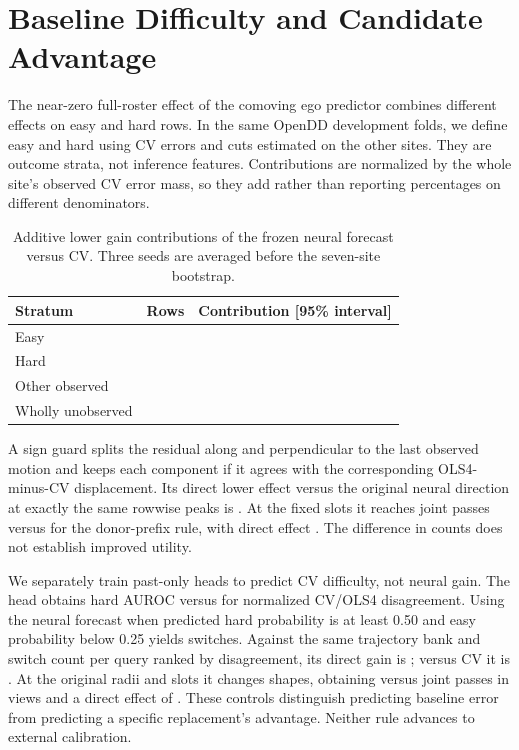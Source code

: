 \section{Baseline Difficulty and Candidate Advantage}

The near-zero full-roster effect of the comoving ego predictor
combines different effects on easy and hard rows. In the same
OpenDD development folds, we define easy and hard using CV errors
and cuts estimated on the other sites. They are outcome strata,
not inference features. Contributions are normalized by the
whole site's observed CV error mass, so they add rather than
reporting percentages on different denominators.

\begin{table}[h]
\centering
\caption{Additive lower gain contributions of the frozen neural
forecast versus CV. Three seeds are averaged before the
seven-site bootstrap.}
\small
\begin{tabular}{lrl}
\toprule
Stratum & Rows & Contribution [95\% interval] \\
\midrule
Easy & \DifficultyEasyRows{} & \DifficultyEasyEffect{} \\
Hard & \DifficultyHardRows{} & \DifficultyHardEffect{} \\
Other observed & \DifficultyOtherRows{} & \DifficultyOtherEffect{} \\
Wholly unobserved & \DifficultyUnobservedRows{} & \DifficultyUnobservedEffect{} \\
\bottomrule
\end{tabular}
\end{table}

A sign guard splits the residual along and perpendicular to
the last observed motion and keeps each component if it agrees
with the corresponding OLS4-minus-CV displacement. Its direct
lower effect versus the original neural direction at exactly
the same rowwise peaks is \DifficultyDirection{}.
At the \DifficultyEdits{} fixed slots it reaches
\DifficultyGuard{} joint passes versus \DifficultyPrefix{} for
the donor-prefix rule, with direct effect \DifficultyGuardMatched{}.
The difference in counts does not establish improved utility.

We separately train \DifficultyFits{} past-only heads to predict CV
difficulty, not neural gain. The head obtains hard AUROC
\DifficultyAUROC{} versus \DifficultyMotionAUC{} for normalized
CV/OLS4 disagreement. Using the neural forecast when predicted hard
probability is at least 0.50 and easy probability below 0.25 yields
\DifficultyRawEdits{} switches. Against the same trajectory bank
and switch count per query ranked by disagreement, its direct
gain is \DifficultyGatedMotion{}; versus CV it is
\DifficultyGatedCV{}. At the original radii and slots it changes
\DifficultySwaps{} shapes, obtaining \DifficultyGate{} versus
\DifficultyPrefix{} joint passes in \DifficultyViews{} views
and a direct effect of \DifficultyGatedFixed{}.
These controls distinguish predicting baseline error from
predicting a specific replacement's advantage. Neither rule
advances to external calibration.
